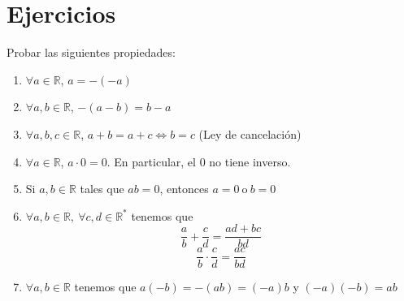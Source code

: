
\section{Ejercicios}
\begin{ejercicio}\label{ej:1.4.1}
    Probar las siguientes propiedades:
    \begin{enumerate}
        \item $\forall a \in \mathbb{R}$, $a = -(-a)$
        
        \item $\forall a,b \in \mathbb{R}$, $-(a-b)=b-a$
        
        \item $\forall a,b,c \in \mathbb{R}$, $a+b=a+c \Longleftrightarrow b=c$ (Ley de cancelación)
        
        \item $\forall a \in \mathbb{R}$, $a \cdot 0=0$. En particular, el $0$ no tiene inverso.
        
        \item Si $a,b \in \mathbb{R}$ tales que $ab=0$, entonces $a = 0 ~\text{o}~ b = 0$
        
        \item \label{ej:1.4.1_6} $\forall a,b \in \mathbb{R}, ~\forall c,d \in \mathbb{R}^{*}$ tenemos que
        \begin{equation*}
            \frac{a}{b}+\frac{c}{d}=\frac{ad+bc}{bd}
        \end{equation*}
        \begin{equation*}
            \frac{a}{b} \cdot \frac{c}{d}=\frac{ac}{bd}
        \end{equation*}
        
        \item $\forall a,b \in \mathbb{R}$ tenemos que $a(-b)=-(ab)=(-a)b$ y $(-a)(-b)=ab$
    \end{enumerate}
    
    \vspace{0.5cm}
\end{ejercicio}


